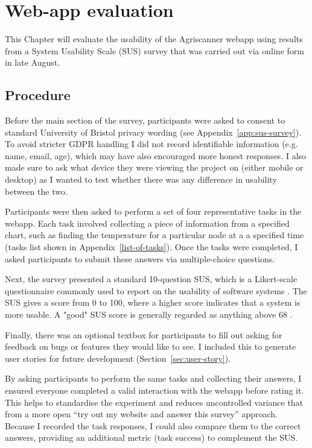 \section{Web-app evaluation}

This Chapter will evaluate the usability of the Agriscanner webapp using results
from a System Usability Scale (SUS) survey that was carried out via online form
in late August.

\subsection{Procedure}

Before the main section of the survey, participants were asked to consent to
standard University of Bristol privacy wording (see
Appendix~\ref{app:sus-survey}). To avoid stricter GDPR handling I did not record
identifiable information (e.g. name, email, age), which may have also encouraged
more honest responses. I also made sure to ask what device they were viewing the
project on (either mobile or desktop) as I wanted to test whether there was any
difference in usability between the two.

Participants were then asked to perform a set of four representative tasks in
the webapp. Each task involved collecting a piece of information from a
specified chart, such as finding the temperature for a particular node at a a
specified time (tasks list shown in Appendix~\ref{list-of-tasks}). Once the
tasks were completed, I asked participants to submit these answers via
multiple-choice questions.

Next, the survey presented a standard 10-question SUS, which is a Likert-scale
questionnaire commonly used to report on the usability of software systems
\cite{brookeSUS1995}. The SUS gives a score from 0 to 100, where a higher score
indicates that a system is more usable. A "good" SUS score is generally regarded
as anything above 68 \cite{sauro2016quantifying}.

Finally, there was an optional textbox for participants to fill out asking for
feedback on bugs or features they would like to see. I included this to generate
user stories for future development (Section~\ref{sec:user-story}).

By asking participants to perform the same tasks and collecting their answers, I
ensured everyone completed a valid interaction with the webapp before rating it.
This helps to standardise the experiment and reduces uncontrolled variance that
from a more open “try out my website and answer this survey” approach. Because I
recorded the task responses, I could also compare them to the correct answers,
providing an additional metric (task success) to complement the SUS.

